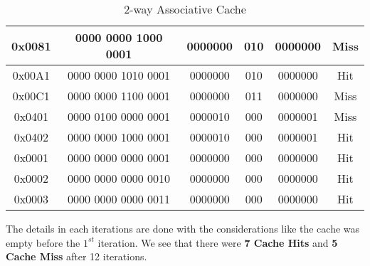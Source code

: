 \documentclass[12pt]{article}
\begin{document}
\begin{table}[]
\begin{center}
\begin{tabular}{|c|c|c|c|c|c|}
0x0081           & 0000 0000 1000 0001 & 0000000           & 010                                                                       & 0000000                                                             & Miss              \\ \hline
0x00A1           & 0000 0000 1010 0001 & 0000000           & 010                                                                       & 0000000                                                             & Hit               \\ \hline
0x00C1           & 0000 0000 1100 0001 & 0000000           & 011                                                                       & 0000000                                                             & Miss              \\ \hline
0x0401           & 0000 0100 0000 0001 & 0000010           & 000                                                                       & 0000001                                                             & Miss              \\ \hline
0x0402           & 0000 0000 1000 0001 & 0000010           & 000                                                                       & 0000001                                                             & Hit               \\ \hline
0x0001           & 0000 0000 0000 0001 & 0000000           & 000                                                                       & 0000000                                                             & Hit               \\ \hline
0x0002           & 0000 0000 0000 0010 & 0000000           & 000                                                                       & 0000000                                                             & Hit               \\ \hline
0x0003           & 0000 0000 0000 0011 & 0000000           & 000                                                                       & 0000000                                                             & Hit               \\ \hline
\end{tabular}
\caption{2-way Associative Cache}
\end{center}
\end{table}

The details in each iterations are done with the considerations like the cache was empty before the $1^{st}$ iteration. We see that there were \textbf{7 Cache Hits} and \textbf{5 Cache Miss} after 12 iterations.
\end{document}
